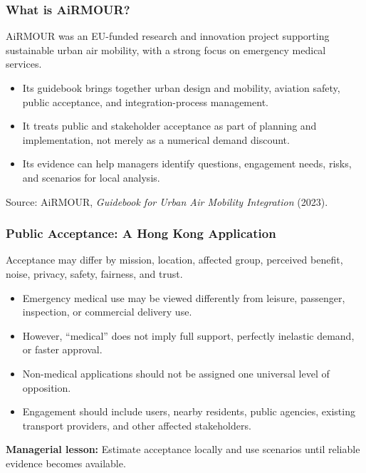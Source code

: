 \documentclass{beamer}
\begin{document}
\begin{frame}[t]
\frametitle{What is AiRMOUR?}
AiRMOUR was an EU-funded research and innovation project supporting sustainable urban air mobility, with a strong focus on emergency medical services.
\begin{itemize}
\item Its guidebook brings together urban design and mobility, aviation safety, public acceptance, and integration-process management.
\item It treats public and stakeholder acceptance as part of planning and implementation, not merely as a numerical demand discount.
\item Its evidence can help managers identify questions, engagement needs, risks, and scenarios for local analysis.
\end{itemize}
\vfill{\tiny Source: AiRMOUR, \textit{Guidebook for Urban Air Mobility Integration} (2023).}
\end{frame}

\begin{frame}[t]
\frametitle{Public Acceptance: A Hong Kong Application}
Acceptance may differ by mission, location, affected group, perceived benefit, noise, privacy, safety, fairness, and trust.
\begin{itemize}
\item Emergency medical use may be viewed differently from leisure, passenger, inspection, or commercial delivery use.
\item However, ``medical'' does not imply full support, perfectly inelastic demand, or faster approval.
\item Non-medical applications should not be assigned one universal level of opposition.
\item Engagement should include users, nearby residents, public agencies, existing transport providers, and other affected stakeholders.
\end{itemize}
\textbf{Managerial lesson:} Estimate acceptance locally and use scenarios until reliable evidence becomes available.
\end{frame}
\end{document}
